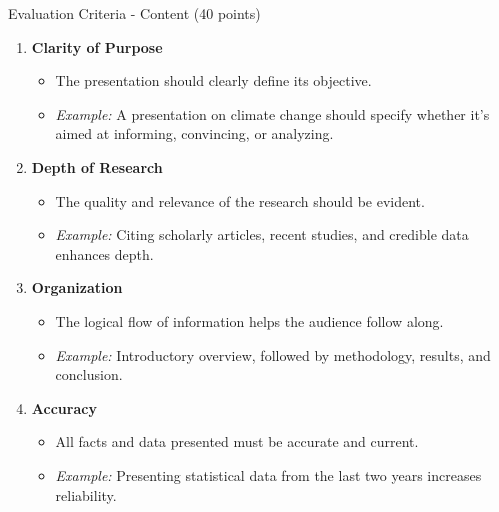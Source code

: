 \documentclass[aspectratio=169]{beamer}
\begin{document}
\begin{frame}[fragile]{Evaluation Criteria - Content (40 points)}
    \begin{enumerate}
        \item \textbf{Clarity of Purpose} 
        \begin{itemize}
            \item The presentation should clearly define its objective.
            \item \textit{Example:} A presentation on climate change should specify whether it’s aimed at informing, convincing, or analyzing.
        \end{itemize}
        
        \item \textbf{Depth of Research}
        \begin{itemize}
            \item The quality and relevance of the research should be evident.
            \item \textit{Example:} Citing scholarly articles, recent studies, and credible data enhances depth.
        \end{itemize}

        \item \textbf{Organization}
        \begin{itemize}
            \item The logical flow of information helps the audience follow along.
            \item \textit{Example:} Introductory overview, followed by methodology, results, and conclusion.
        \end{itemize}

        \item \textbf{Accuracy}
        \begin{itemize}
            \item All facts and data presented must be accurate and current.
            \item \textit{Example:} Presenting statistical data from the last two years increases reliability.
        \end{itemize}
    \end{enumerate}
\end{frame}
\end{document}
